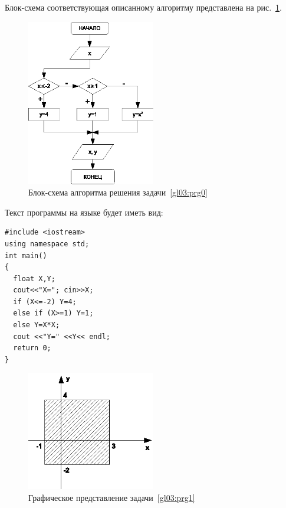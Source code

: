 Блок-схема соответствующая описанному алгоритму представлена на рис.~\ref{ch03:refDrawing10}.

\begin{figure}[htb]
\begin{center}
\includegraphics[width=0.5\textwidth]{img/ris_3_11}
\caption{Блок-схема алгоритма решения задачи~\ref{gl03:prg0}}
\label{ch03:refDrawing10}
\end{center}
\end{figure}

Текст программы на языке  будет иметь вид:
\begin{lstlisting}
#include <iostream>
using namespace std;
int main()
{
  float X,Y;
  cout<<"X="; cin>>X;
  if (X<=-2) Y=4;
  else if (X>=1) Y=1;
  else Y=X*X;
  cout <<"Y=" <<Y<< endl;
  return 0;
}
\end{lstlisting}


\begin{figure}[htb]
\begin{center}
\includegraphics[width=0.5\textwidth]{img/ris_3_12}
\caption{Графическое представление задачи~\ref{gl03:prg1}}
\label{ch03:refDrawing11}
\end{center}
\end{figure}

